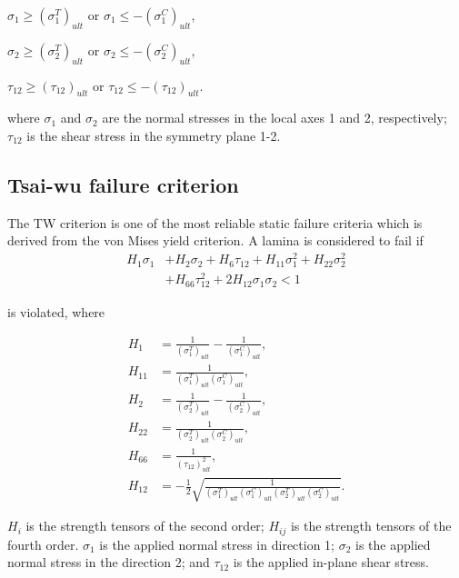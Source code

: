 $\sigma_1 \geq (\sigma _1^{T})_{ult} $ or $\sigma_1 \leq -(\sigma _1^{C})_{ult}
$,

$\sigma_2 \geq (\sigma _2^{T})_{ult} $ or $\sigma_2 \leq -(\sigma _2^{C})_{ult}
$,

$\tau_{12} \geq (\tau_{12})_{ult} $  or $\tau_{12} \leq -(\tau_{12})_{ult} $.

where $\sigma_1$ and $\sigma_2$ are the normal stresses in the local axes 1 and 2, respectively;
$\tau_{12}$ is the shear stress in the symmetry plane 1-2.

\subsection{Tsai-wu failure criterion}
The TW criterion is one of the most reliable static failure criteria which is derived from the von
Mises yield criterion.  
A lamina is considered to fail
if \begin{equation} \label{eq:tsai_wu}
\begin{split}
	H_1 \sigma_1  & + H_2 \sigma_2 + H_6 \tau_{12} + H_{11}\sigma_1^2 + H_{22} \sigma_2^2 \\
				  & + H_{66}  \tau_{12}^2 + 2H_{12}\sigma_1\sigma_2 < 1
\end{split}
\end{equation}

is violated, where

\begin{equation}
	\begin{split}
		H_{1}&=\frac{1}{\left(\sigma_{1}^{T}\right)_{u l
		t}}-\frac{1}{\left(\sigma_{1}^{C}\right)_{u l t}} \textstyle{,} \\
		H_{11}&=\frac{1}{\left(\sigma_{1}^{T}\right)_{u l t}\left(\sigma_{1}^{C}\right)_{u l t}} \textstyle{,}\\
		H_{2}&=\frac{1}{\left(\sigma_{2}^{T}\right)_{u l t}}-\frac{1}{\left(\sigma_{2}^{C}\right)_{u l t}} \textstyle{,}\\
		H_{22}&=\frac{1}{\left(\sigma_{2}^{T}\right)_{u l t}\left(\sigma_{2}^{C}\right)_{u l t}} \textstyle{,}\\
		H_{66}&=\frac{1}{\left(\tau_{12}\right)_{u l t}^{2}} \textstyle{,}\\
		H_{12}&=-\frac{1}{2} \sqrt{\frac{1}{\left(\sigma_{1}^{T}\right)_{u l
		t}\left(\sigma_{1}^{C}\right)_{u l t}\left(\sigma_{2}^{T}\right)_{u l
		t}\left(\sigma_{2}^{C}\right)_{u l t}}}\textstyle{.}
	\end{split}
\end{equation}

$H_i$ is the strength tensors of the second order; $H_{ij}$ is the strength
tensors of the fourth order. $\sigma_1$ is the applied normal stress in 
direction 1; $\sigma_2$ is the applied normal stress in the direction 2; and
$\tau_{12}$ is the applied in-plane shear stress.





